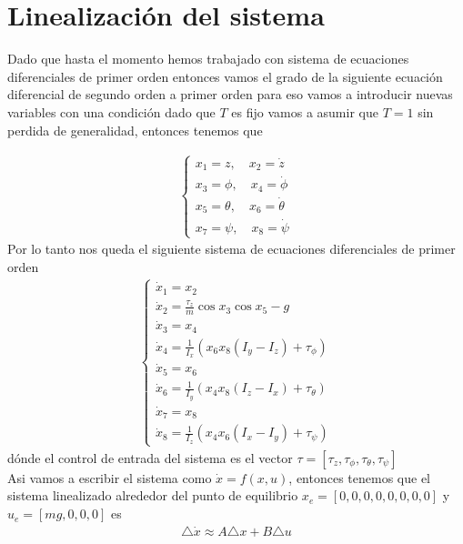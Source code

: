 \documentclass{uofa-eng-assignment}
\begin{document}
\section{Linealización del sistema}
Dado que hasta el momento hemos trabajado con sistema de ecuaciones diferenciales de primer orden entonces vamos
el grado de la siguiente ecuación diferencial de segundo orden a primer orden para eso vamos a introducir nuevas variables 
con una condición dado que $T$ es fijo vamos a asumir que $T=1$ sin perdida de generalidad, entonces tenemos que

\begin{align*}
    \begin{cases}
        x_1=z, \quad x_2=\dot{z} \\
        x_3=\phi, \quad x_4=\dot{\phi} \\
        x_5=\theta, \quad x_6=\dot{\theta} \\
        x_7=\psi, \quad x_8=\dot{\psi}
    \end{cases}    
\end{align*}
Por lo tanto nos queda el siguiente sistema de ecuaciones diferenciales de primer orden
\begin{align*}
    \begin{cases}
        \dot{x}_1 = x_2 \\
        \dot{x}_2 = \frac{\tau_z}{m} \cos x_3 \cos x_5 - g \\
        \dot{x}_3 = x_4 \\
        \dot{x}_4 = \frac{1}{I_x} \left( x_6 x_8 (I_y - I_z) + \tau_\phi \right) \\
        \dot{x}_5 = x_6 \\
        \dot{x}_6 = \frac{1}{I_y} \left( x_4 x_8 (I_z - I_x) + \tau_\theta \right) \\
        \dot{x}_7 = x_8 \\
        \dot{x}_8 = \frac{1}{I_z} \left( x_4 x_6 (I_x - I_y) + \tau_\psi \right)
    \end{cases}
\end{align*}
dónde el control de entrada del sistema es el vector $\tau=[\tau_z, \tau_\phi, \tau_\theta, \tau_\psi]$ \\
Asi vamos a escribir el sistema como $\dot{x}=f(x,u)$, 
entonces tenemos que el sistema linealizado alrededor del punto de equilibrio 
$x_e=[0,0,0,0,0,0,0,0]$ y $u_e=[mg,0,0,0]$ es
\begin{align*}
    \triangle \dot{x} \approx A \triangle x + B \triangle u
\end{align*}
\end{document}
